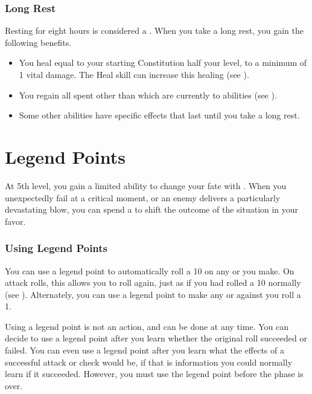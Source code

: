        \subsubsection{Long Rest}\label{Long Rest}
            Resting for eight hours is considered a .
            When you take a long rest, you gain the following benefits.
            \begin{itemize}
                \item You heal  equal to your starting Constitution \add half your level, to a minimum of 1 vital damage.
                    The Heal skill can increase this healing (see ).
                \item You regain all spent  other than  which are currently  to abilities (see ).
                \item Some other abilities have specific effects that last until you take a long rest.
            \end{itemize}

\section{Legend Points}\label{Legend Points}
    At 5th level, you gain a limited ability to change your fate with .
    When you unexpectedly fail at a critical moment, or an enemy delivers a particularly devastating blow, you can spend a  to shift the outcome of the situation in your favor.

    \subsubsection{Using Legend Points}
        You can use a legend point to automatically roll a 10 on any  or  you make.
        On attack rolls, this allows you to roll again, just as if you had rolled a 10 normally (see ).
        Alternately, you can use a legend point to make any  or  against you roll a 1.

        Using a legend point is not an action, and can be done at any time.
        You can decide to use a legend point after you learn whether the original roll succeeded or failed.
        You can even use a legend point after you learn what the effects of a successful attack or check would be, if that is information you could normally learn if it succeeded.
        However, you must use the legend point before the phase is over.

